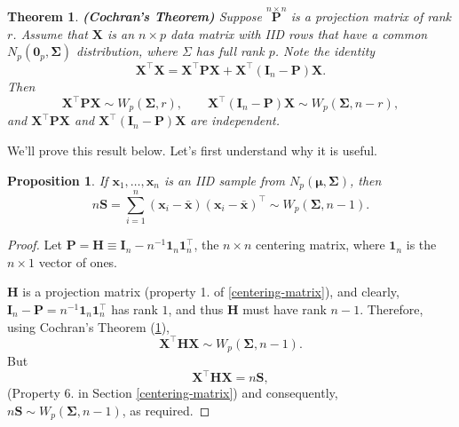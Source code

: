 \documentclass[
]{book}
\newtheorem{theorem}{Theorem}[chapter]
\newtheorem{proposition}{Proposition}[chapter]
\theoremstyle{definition}
\theoremstyle{definition}
\theoremstyle{definition}
\theoremstyle{definition}
\theoremstyle{remark}
\begin{document}
\begin{theorem}
\protect\hypertarget{thm:six11}{}\label{thm:six11}\textbf{(Cochran's Theorem)} Suppose \(\stackrel{n \times n}{\mathbf P}\) is a projection matrix of rank \(r\). Assume that \(\mathbf X\) is an \(n \times p\) data matrix with IID rows that have a common \(N_p({\mathbf 0}_p, \boldsymbol{\Sigma})\) distribution, where \(\Sigma\) has full rank \(p\). Note the identity
\begin{equation}
\mathbf X^\top \mathbf X= \mathbf X^\top {\mathbf P} \mathbf X+ \mathbf X^\top ({\mathbf I}_n -{\mathbf P})\mathbf X.
\label{eq:Cochran1}
\end{equation}
Then
\begin{equation}
\mathbf X^\top {\mathbf P} \mathbf X\sim W_p(\boldsymbol{\Sigma}, r), \qquad  \mathbf X^\top ({\mathbf I}_n -{\mathbf P})\mathbf X\sim W_p(\boldsymbol{\Sigma}, n-r),
\label{eq:Cochran2}
\end{equation}
and \(\mathbf X^\top {\mathbf P} \mathbf X\) and \(\mathbf X^\top ({\mathbf I}_n -{\mathbf P})\mathbf X\)
are independent.
\end{theorem}

We'll prove this result below. Let's first understand why it is useful.

\begin{proposition}
\protect\hypertarget{prp:six12}{}\label{prp:six12}If \(\mathbf x_1,\ldots,\mathbf x_n\) is an IID sample from \(N_p({\boldsymbol{\mu}},\boldsymbol{\Sigma})\), then
\[ n \mathbf S= \sum_{i=1}^n (\mathbf x_i - \bar{\mathbf x})(\mathbf x_i - \bar{\mathbf x})^\top \sim W_p(\boldsymbol{\Sigma},n-1).\]
\end{proposition}

\begin{proof}
Let \(\mathbf P= {\mathbf H}\equiv \mathbf I_n - n^{-1}{\mathbf 1}_n {\mathbf 1}_n^\top\), the \(n \times n\) centering matrix, where \({\mathbf 1}_n\) is the \(n \times 1\) vector of ones.

\(\mathbf H\) is a projection matrix (property 1. of \ref{centering-matrix}), and clearly, \(\mathbf I_n - \mathbf P=n^{-1} {\mathbf 1}_n {\mathbf 1}_n^\top\) has rank \(1\), and thus \(\mathbf H\) must have rank \(n-1\). Therefore, using Cochran's Theorem (\ref{thm:six11}),
\[
\mathbf X^\top \mathbf H\mathbf X\sim W_p(\boldsymbol{\Sigma}, n-1).
\]
But\\
\[\mathbf X^\top \mathbf H\mathbf X=n\mathbf S,\]
(Property 6. in Section \ref{centering-matrix})
and consequently, \(n\mathbf S\sim   W_p(\boldsymbol{\Sigma}, n-1)\), as required.
\end{proof}
\end{document}
